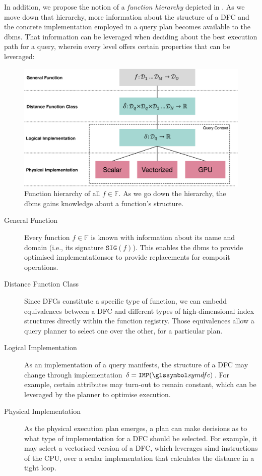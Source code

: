 In addition, we propose the notion of a \emph{function hierarchy} depicted in . As we move down that hierarchy, more information about the structure of a DFC and the concrete implementation employed in a query plan becomes available to the \acrshort{dbms}. That information can be leveraged when deciding about the best execution path for a query, wherein every level offers certain properties that can be leveraged:

\begin{figure}[bt]
    \centering
    \includegraphics[width=\textwidth]{figures/function_hierarchy.eps}
    \caption{Function hierarchy of all $f \in \mathbb{F}$. As we go down the hierarchy, the \acrshort{dbms} gains knowledge about a function's structure.}
    \label{figure:function_hierarchy}
\end{figure}

\begin{description}
    \item[General Function] Every function $f \in \mathbb{F}$ is known with information about its name and domain (i.e., its signature $\mathtt{SIG}(f)$). This enables the \acrshort{dbms} to provide optimised implementationsor to provide replacements for composit operations.
    \item[Distance Function Class] Since DFCs constitute a specific type of function, we can embedd equivalences between a DFC and different types of high-dimensional index structures directly within the function registry. Those equivalences allow a query planner to select one over the other, for a particular plan.
    \item[Logical Implementation] As an implementation of a query manifests, the structure of a DFC may change through implementation $\delta = \mathtt{IMP}(\symdfc)$. For example, certain attributes may turn-out to remain constant, which can be leveraged by the planner to optimise execution.
    \item[Physical Implementation] As the physical execution plan emerges, a plan can make decisions as to what type of implementation for a DFC should be selected. For example, it may select a vectorised version of a DFC, which leverages \acrfull{simd} instructions of the CPU, over a scalar implementation that calculates the distance in a tight loop.
\end{description}

